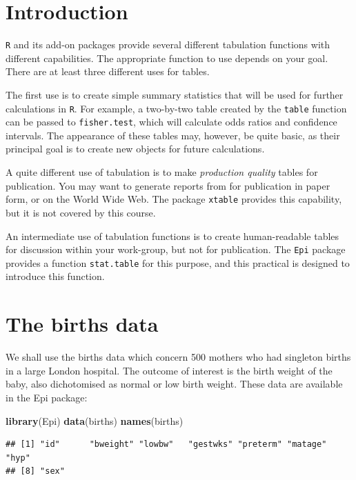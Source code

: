 \documentclass[
]{book}
\newenvironment{Shaded}{\begin{snugshade}}{\end{snugshade}}
\newcommand{\FunctionTok}[1]{\textcolor[rgb]{0.13,0.29,0.53}{\textbf{#1}}}
\newcommand{\NormalTok}[1]{#1}
\begin{document}
\section{Introduction}\label{introduction-2}

\texttt{R} and its add-on packages provide several different
tabulation functions with different capabilities. The appropriate function
to use depends on your goal. There are at least three different uses for
tables.

The first use is to create simple summary statistics that will be used
for further calculations in \texttt{R}. For example,
a two-by-two table created by the \texttt{table} function can be passed
to \texttt{fisher.test}, which will calculate odds ratios and confidence
intervals. The appearance of these tables may, however, be quite basic,
as their principal goal is to create new objects for future calculations.

A quite different use of tabulation is to make \emph{production quality}
tables for publication. You may want to generate reports from for
publication in paper form, or on the World Wide Web. The package
\texttt{xtable} provides this capability, but it is not covered by this course.

An intermediate use of tabulation functions is to create human-readable
tables for discussion within your work-group, but not for publication. The
\texttt{Epi} package provides a function \texttt{stat.table} for this purpose,
and this practical is designed to introduce this function.

\section{The births data}\label{the-births-data-1}

We shall use the births data which concern 500 mothers who had
singleton births in a large London hospital. The outcome of interest
is the birth weight of the baby, also dichotomised as normal or low
birth weight. These data are available in the Epi package:

\begin{Shaded}
\begin{Highlighting}[]
\FunctionTok{library}\NormalTok{(Epi)}
\FunctionTok{data}\NormalTok{(births)}
\FunctionTok{names}\NormalTok{(births)}
\end{Highlighting}
\end{Shaded}

\begin{verbatim}
## [1] "id"      "bweight" "lowbw"   "gestwks" "preterm" "matage"  "hyp"    
## [8] "sex"
\end{verbatim}
\end{document}

